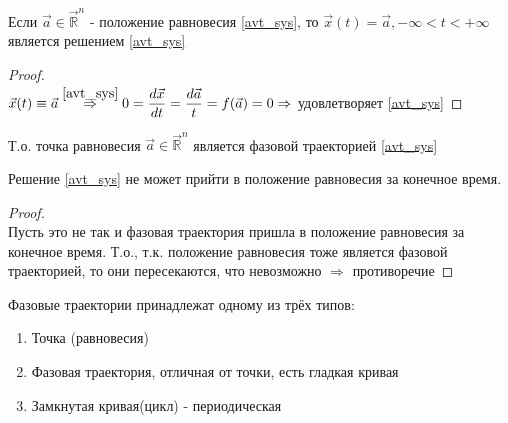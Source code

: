 	\begin{proposition}
		Если $ \vec{a} \in \vec{\mathbb{R}}^n $ - положение равновесия \eqref{avt_sys}, то $ \vec{x}(t) = \vec{a}, -\infty < t < + \infty$ является решением \eqref{avt_sys}
	\end{proposition}

	\begin{proof}
		\ \\
		$\vec{x}(t) \equiv \vec{a} \overset{\eqref{avt_sys}}{\Rightarrow} 0 = \dfrac{d\vec{x}}{dt} = \dfrac{d \vec{a}}{t} = f(\vec{a}) = 0 \Rightarrow$ удовлетворяет \eqref{avt_sys}
	\end{proof}
	\noindent Т.о. точка равновесия $ \vec{a} \in \vec{\mathbb{R}}^n$ является фазовой траекторией \eqref{avt_sys}
	
	\begin{corollary}
		Решение \eqref{avt_sys} не может прийти в положение равновесия за конечное время.
	\end{corollary}

	\begin{proof}
		\ \\
		Пусть это не так и фазовая траектория пришла в положение равновесия за конечное время. Т.о., т.к. положение равновесия тоже является фазовой траекторией, то они пересекаются, что невозможно $\Rightarrow$ противоречие 
	\end{proof}

	\begin{theorem}
		Фазовые траектории принадлежат одному из трёх типов:
		\begin{enumerate}
			\item Точка (равновесия)
			\item Фазовая траектория, отличная от точки, есть гладкая кривая
			\item Замкнутая кривая(цикл) - периодическая
		\end{enumerate}
	\end{theorem}

